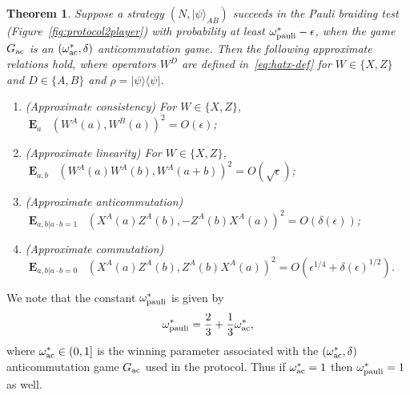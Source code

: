 \documentclass[11pt,letterpaper]{article}
\newcommand{\<}{\langle}
\renewcommand{\>}{\rangle}
\newtheorem{theorem}{Theorem}
\newcommand{\bra}[1]{\< #1 |}
\newcommand{\ket}[1]{| #1 \>}
\newcommand{\eps}{\epsilon}
\DeclareMathOperator{\E}{\mathbf{E}}
\DeclareMathOperator{\DIS}{d}
\DeclareMathOperator{\Drho}{\DIS_\rho}
\newcommand{\wg}{\omega^*_{\ensuremath{\rm ac}}}
\newcommand{\enc}{\ensuremath{\rm pauli}}
\newcommand{\ac}{{\ensuremath{\rm ac}}}
\newcommand{\proj}[1]{\ket{#1}\bra{#1}}
\begin{document}
\begin{theorem}  \label{thm:gametwoplayer}
 Suppose a strategy $(N,\ket{\psi}_{AB})$ succeeds in the
  Pauli braiding test (Figure~\ref{fig:protocol2player}) with probability at least
  $\omega^*_{\enc} - \eps$, when the game $G_\ac$ is an $(\wg,\delta)$ anticommutation game. Then the following approximate relations hold, where operators $W^D$ are defined in~\eqref{eq:hatx-def} for $W\in\{X,Z\}$ and $D\in\{A,B\}$ and $\rho=\proj{\psi}$. 
	\begin{enumerate}
\item (Approximate consistency) For $W \in \{X, Z\}$, $\E_{a}
  \Drho(W^A(a), W^B(a))^2 = O(\eps)$;
\item (Approximate linearity) For $W \in \{X, Z\}$, $\E_{a,b} \Drho
  (W^A(a) W^A(b), W^A(a+b) )^2 = O(\sqrt{\eps})$;
\item (Approximate anticommutation) $\E_{a, b|a\cdot b=1} \Drho( X^A(a) Z^A(b) ,
  - Z^A(b) X^A(a))^{2} = O(\delta(\eps))$;
\item (Approximate commutation) $\E_{a, b|a\cdot b=0} \Drho( X^A(a) Z^A(b) ,
  Z^A(b) X^A(a))^{2} = O(\eps^{1/4} + \delta(\eps)^{1/2})$. 
\end{enumerate}
\end{theorem}

We note that the constant $\omega^*_{\enc}$ is given by
\begin{equation} \omega^*_{\enc} = \frac{2}{3} + \frac{1}{3}
  \wg, \label{eq:omegaenc} \end{equation}
where $\wg \in (0, 1]$ is the winning parameter associated with the $(\wg,\delta)$ anticommutation game $G_\ac$ used in the protocol. Thus if $\wg=1$ then $\omega^*_{\enc}=1$ as well. 
\end{document}
